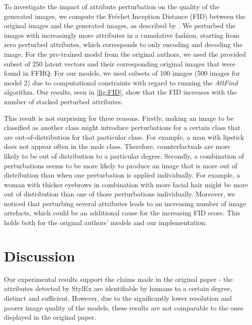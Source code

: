 To investigate the impact of attribute perturbation on the quality of the generated images, we compute the Fréchet Inception Distance (FID)  \cite{heusel2017gans} between the original images and the generated images, as described by \citet{Seitzer2020FID}. We perturbed the images with increasingly more attributes in a cumulative fashion, starting from zero perturbed attributes, which corresponds to only encoding and decoding the image. For the pre-trained model from the original authors, we used the provided subset of 250 latent vectors and their corresponding original images that were found in FFHQ. For our models, we used subsets of 100 images (500 images for model 2) due to computational constraints with regard to running the \textit{AttFind} algorithm. Our results, seen in \ref{fig:FID}, show that the FID increases with the number of stacked perturbed attributes.

This result is not surprising for three reasons. Firstly, making an image to be classified as another class might introduce perturbations for a certain class that are out-of-distribution for that particular class. For example, a man with lipstick does not appear often in the male class. Therefore, counterfactuals are more likely to be out of distribution to a particular degree. Secondly, a combination of perturbations seems to be more likely to produce an image that is more out of distribution than when one perturbation is applied individually. For example, a woman with thicker eyebrows in combination with more facial hair might be more out of distribution than one of those perturbations individually. Moreover, we noticed that perturbing several attributes leads to an increasing number of image artefacts, which could be an additional cause for the increasing FID score. This holds both for the original authors' models and our implementation.

\section{Discussion}

Our experimental results support the claims made in the original paper - the attributes detected by StylEx are identifiable by humans to a certain degree, distinct and sufficient. However, due to the significantly lower resolution and poorer image quality of the models, these results are not comparable to the ones displayed in the original paper.

